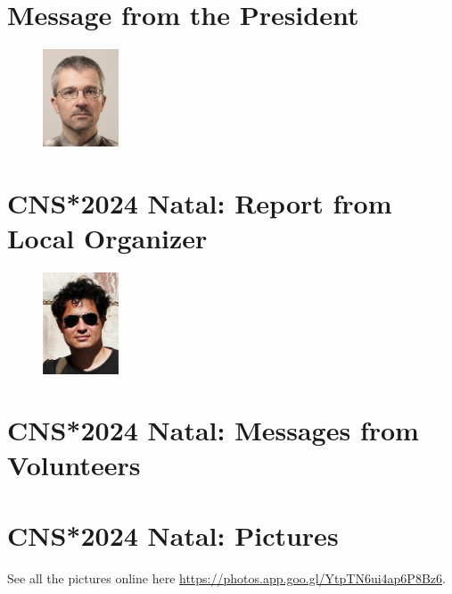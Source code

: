 \documentclass[11pt,a4paper,oneside]{article}
\begin{document}

\newpage

\pagestyle{fancy}
\fancyhead{}
\fancyfoot{}

\newpage
\section*{Message from the President}%
\begin{figure}
  \includegraphics[width=0.2\textwidth]{images/Thomas}
\end{figure}

\lipsum[1-3]

\newpage
\section*{CNS*2024 Natal: Report from Local Organizer}%
\begin{figure}
  \includegraphics[width=0.2\textwidth]{images/Cesar}
\end{figure}

\lipsum[1-3]

\newpage
\section*{CNS*2024 Natal: Messages from Volunteers}%
\lipsum[1-3]

\newpage
\section*{CNS*2024 Natal: Pictures}%
\sectionauthor{  }
See all the pictures online here \url{https://photos.app.goo.gl/YtpTN6ui4ap6P8Bz6}.
\end{document}
